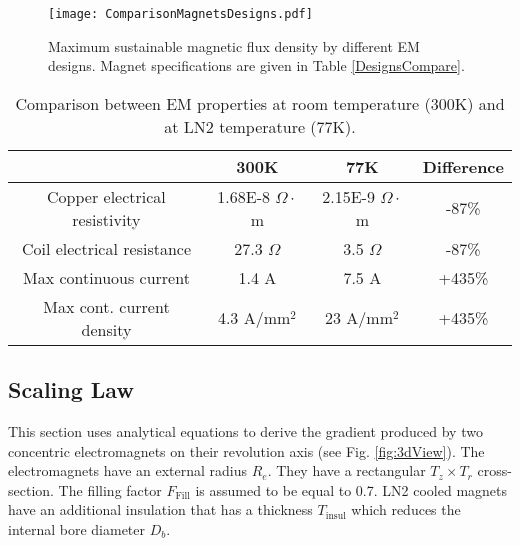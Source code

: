 \begin{figure}
\texttt{[image: ComparisonMagnetsDesigns.pdf]}
	\caption{ Maximum sustainable magnetic flux density  by different EM designs. Magnet specifications are given in Table \ref{DesignsCompare}.
	\label{fig:ComparisonMagnetsDesigns}}
\end{figure}

\begin{table}[]
\centering
\caption{Comparison between EM properties at room temperature (300K) and at LN2 temperature (77K).}
\label{CoolingComparison}
\begin{tabular}{@{}cccc@{}}
\toprule
 & 300K & 77K & Difference \\ \midrule
Copper electrical resistivity & 1.68E-8 $\Omega\cdot$m & 2.15E-9 $\Omega\cdot$m & -87\% \\ 
Coil electrical resistance & 27.3 $\Omega$ & 3.5 $\Omega$ & -87\% \\ 
Max continuous current & 1.4 A & 7.5 A & +435\% \\ 
Max cont. current density & 4.3 A/mm$^2$ & 23 A/mm$^2$ & +435\% \\ 
\bottomrule
\end{tabular}
\end{table}

\subsection{Scaling Law}

This section uses analytical equations to derive the gradient produced by two concentric electromagnets on their revolution axis (see Fig. \ref{fig:3dView}). The electromagnets have an external radius $R_e$. They have a rectangular $T_z \times T_r$ cross-section. The filling factor $F_{\textrm{Fill}} $ is assumed to be equal to 0.7. LN2 cooled magnets have an additional insulation that has a thickness $T_{\textrm{insul}}$ which reduces the internal bore diameter $D_b$.

